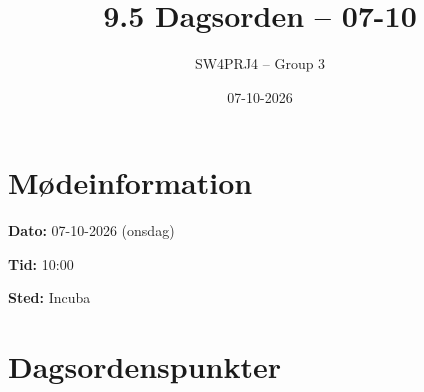 \documentclass[a4paper,11pt]{article}
\title{9.5 Dagsorden -- 07-10}
\author{SW4PRJ4 -- Group 3}
\date{07-10-2026}
\begin{document}
\maketitle

\section*{Mødeinformation}

\textbf{Dato:} 07-10-2026 (onsdag)

\textbf{Tid:} 10:00

\textbf{Sted:} Incuba

\section*{Dagsordenspunkter}
\end{document}
